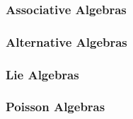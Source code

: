 


\subsubsection{Associative Algebras} 

\subsubsection{Alternative Algebras} 

\subsubsection{Lie Algebras} 



\subsubsection{Poisson Algebras} 


